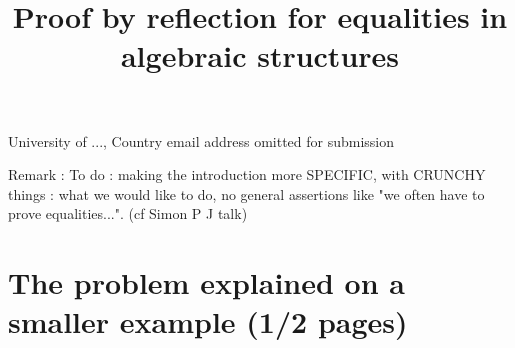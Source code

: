 \documentclass{sigplanconf}
\begin{document}
\setlength{\pdfpageheight}{\paperheight}
\setlength{\pdfpagewidth}{\paperwidth}






\title{Proof by reflection for equalities in algebraic structures}

           {University of ..., Country}
           {email address omitted for submission}



\maketitle

\nocite{*}







Remark : To do : making the introduction more SPECIFIC, with CRUNCHY things : what we would like to do, no general assertions like "we often have to prove equalities...". (cf Simon P J talk)



         
\section {The problem explained on a smaller example (1/2 pages)}
\end{document}

